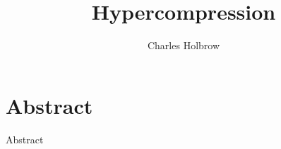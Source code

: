 \documentclass[openany]{tufte-book}
\title{Hypercompression}
\author{Charles Holbrow}
\begin{document}
\frontmatter


\chapter*{Abstract}
\label{ch:abstract}
 Abstract
\clearpage




\mainmatter
\tableofcontents







\backmatter
%



\end{document}
